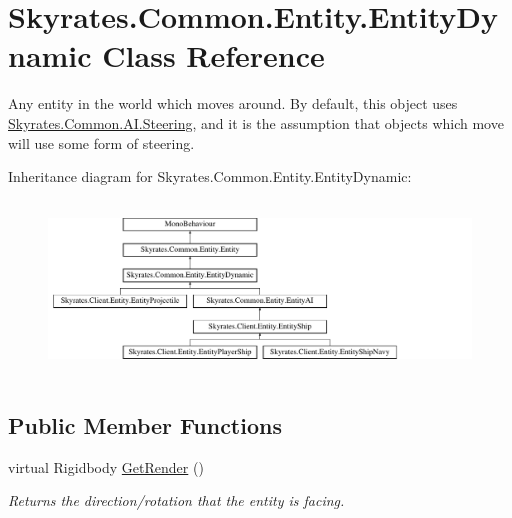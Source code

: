 \hypertarget{class_skyrates_1_1_common_1_1_entity_1_1_entity_dynamic}{\section{Skyrates.\-Common.\-Entity.\-Entity\-Dynamic Class Reference}
\label{class_skyrates_1_1_common_1_1_entity_1_1_entity_dynamic}
}


Any entity in the world which moves around. By default, this object uses \hyperlink{class_skyrates_1_1_common_1_1_a_i_1_1_steering}{Skyrates.\-Common.\-A\-I.\-Steering}, and it is the assumption that objects which move will use some form of steering.  


Inheritance diagram for Skyrates.\-Common.\-Entity.\-Entity\-Dynamic\-:\begin{figure}[H]
\begin{center}
\leavevmode
\includegraphics[height=4.666667cm]{class_skyrates_1_1_common_1_1_entity_1_1_entity_dynamic}
\end{center}
\end{figure}
\subsection*{Public Member Functions}
\begin{DoxyCompactItemize}
\item 
virtual Rigidbody \hyperlink{class_skyrates_1_1_common_1_1_entity_1_1_entity_dynamic_a48f16744ac7eb3a340379f55e31ef6a8}{Get\-Render} ()
\begin{DoxyCompactList}\small\item\em Returns the direction/rotation that the entity is facing. \end{DoxyCompactList}\end{DoxyCompactItemize}
